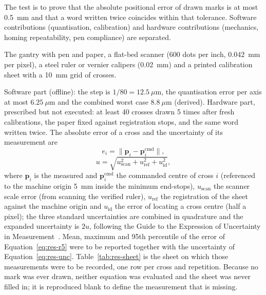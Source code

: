 \medskip
\label{sec:res-qtp5}


            The test is to prove that the absolute positional error of drawn marks is at most 0.5~mm and that a word written twice coincides within that tolerance.
            Software contributions (quantisation, calibration) and hardware contributions (mechanics, homing repeatability, pen compliance) are separated.


            The gantry with pen and paper, a flat-bed scanner (600 dots per inch, 0.042~mm per pixel), a steel ruler or vernier calipers (0.02~mm) and a printed calibration sheet with a 10~mm grid of crosses.


            Software part (offline): the step is $1/80=12.5~\mu$m, the quantisation error per axis at most $6.25~\mu$m and the combined worst case $8.8~\mu$m (derived).
            Hardware part, prescribed but not executed: at least 40 crosses drawn 5 times after fresh calibrations, the paper fixed against registration stops, and the same word written twice.
            The absolute error of a cross and the uncertainty of its measurement are
            \begin{equation}
            \label{eq:res-r5}
            e_i=\lVert\mathbf{p}_i-\mathbf{p}_i^{\mathrm{cmd}}\rVert,
            \end{equation}
            \begin{equation}
            \label{eq:res-unc}
            u=\sqrt{u_{\mathrm{scan}}^2+u_{\mathrm{ref}}^2+u_{\mathrm{id}}^2},
            \end{equation}
            where $\mathbf{p}_i$ is the measured and $\mathbf{p}_i^{\mathrm{cmd}}$ the commanded centre of cross $i$ (referenced to the machine origin 5~mm inside the minimum end-stops), $u_{\mathrm{scan}}$ the scanner scale error (from scanning the verified ruler), $u_{\mathrm{ref}}$ the registration of the sheet against the machine origin and $u_{\mathrm{id}}$ the error of locating a cross centre (half a pixel); the three standard uncertainties are combined in quadrature and the expanded uncertainty is $2u$, following the Guide to the Expression of Uncertainty in Measurement~\cite{jcgm2008}.
            Mean, maximum and 95th percentile of the error of Equation~\ref{eq:res-r5} were to be reported together with the uncertainty of Equation~\ref{eq:res-unc}.
            Table~\ref{tab:res-sheet} is the sheet on which those measurements were to be recorded, one row per cross and repetition. Because no mark was ever drawn, neither equation was evaluated and the sheet was never filled in; it is reproduced blank to define the measurement that is missing.

